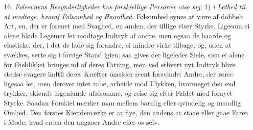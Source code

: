 \documentclass[12pt,a4paper]{article}
\begin{document}
16. \emph{Føleevnens Besynderligheder hos forskiellige Personer vise sig:} 1) \emph{i
Lethed til at modtage, hvoraf Følsomhed og Haardhed.} Følsomhed synes at være af dobbelt
Art, en, der er forenet med Svaghed, en anden, der tillige viser Styrke. Ligesom ei alene
bløde Legemer let modtage Indtryk af andre, men ogsaa de haarde og elastiske, der, i det
de lade sig forandre, ei mindre virke tilbage, og, uden at svækkes, sette sig i forrige
Stand igien; saa gives der ligeledes Siele, som ei alene for Øieblikket bringes ud af
deres Fatning, men ved ethvert nyt Indtryk blive stedse svagere indtil deres Kræfter
omsider reent forsvinde: Andre, der røres ligesaa let, men derover intet tabe, arbeide mod
Ulykken, hvormeget den end trykker, skiøndt ingenlunde ufølsomme, og reise sig efter
Faldet med fornyet Styrke. Saadan Forskiel mærker man mellem barnlig eller qvindelig og
mandlig Ømhed. Den førstes Kiendemærke er at flye, den andens at staae eller gaae Faren i
Møde, hvad enten den angaaer Andre eller os selv.
\end{document}
